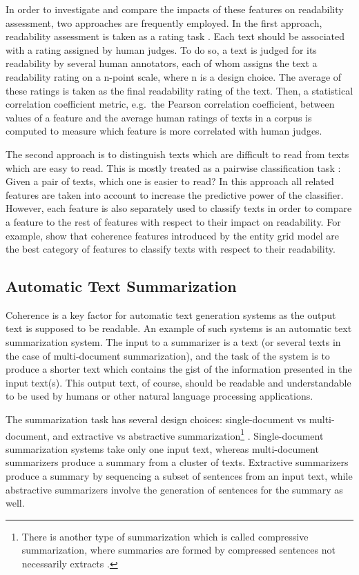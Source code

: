 In order to investigate and compare the impacts of these features on readability assessment, two approaches are frequently employed. 
In the first approach, readability assessment is taken as a rating task \cite{pitler08,kate10}. 
Each text should be associated with a rating assigned by human judges. 
To do so, a text is judged for its readability by several human annotators, each of whom assigns the text a readability rating on a n-point scale, where n is a design choice.  
The average of these ratings is taken as the final readability rating of the text. 
Then, a statistical correlation coefficient metric, e.g.\ the Pearson correlation coefficient, between values of a feature and the average human ratings of texts in a corpus is computed to measure which feature is more correlated with human judges.  

The second approach is to distinguish texts which are difficult to read from texts which are easy to read. 
This is mostly treated as a pairwise classification task \cite{pitler08,guinaudeau13,barzilay08}: Given a pair of texts, which one is easier to read? 
In this approach all related features are taken into account to increase the predictive power of the classifier. 
However, each feature is also separately used to classify texts in order to compare a feature to the rest of features with respect to their impact on readability.  
For example,  show that coherence features introduced by the entity grid model are the best category of features to classify texts with respect to their readability. 

\subsection{Automatic Text Summarization}

Coherence is a key factor for automatic text generation systems as the output text is supposed to be readable. 
An example of such systems is an automatic text summarization system.
The input to a summarizer is a text (or several texts in the case of multi-document summarization), and the task of the system is to produce a shorter text which contains the gist of the information presented in the input text(s). 
This output text, of course, should be readable and understandable to be used by humans or other natural language processing applications. 

The summarization task has several design choices: single-document vs multi-document, and extractive vs abstractive summarization\footnote{There is another type of summarization which is called compressive summarization, where summaries are formed by compressed sentences not necessarily extracts \cite{knight00}.} \cite{hahn00}. 
Single-document summarization systems take only one input text, whereas multi-document summarizers produce a summary from a cluster of texts. 
Extractive summarizers \cite{kupiec95,carbonell98,gillick09} produce a summary by sequencing a subset of sentences from an input text, while abstractive summarizers \cite{wanglu13b,alfonseca13} involve the generation of sentences for the summary as well.   

